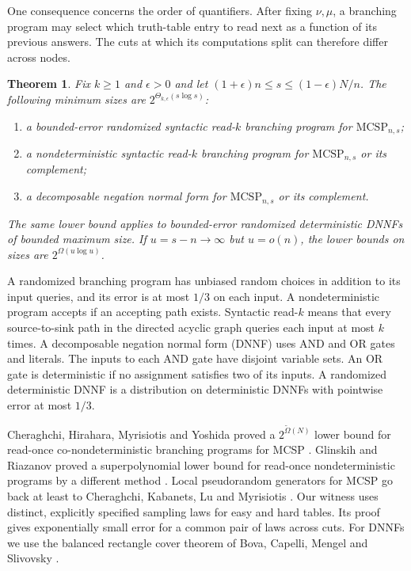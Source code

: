 \documentclass[11pt]{article}
\newtheorem{theorem}{Theorem}[section]
\newcommand{\mc}{\mathrm{MCSP}}
\begin{document}
One consequence concerns the order of quantifiers. After fixing $\nu,\mu$, a branching program may select which truth-table entry to read next as a function of its previous answers. The cuts at which its computations split can therefore differ across nodes.

\begin{theorem}\label{t:size}
Fix $k\ge1$ and $\epsilon>0$ and let $(1+\epsilon)n\le s\le(1-\epsilon)N/n$. The following minimum sizes are $2^{\Theta_{k,\epsilon}(s\log s)}$:
\begin{enumerate}
\item a bounded-error randomized syntactic read-$k$ branching program for $\mc_{n,s}$;
\item a nondeterministic syntactic read-$k$ branching program for $\mc_{n,s}$ or its complement;
\item a decomposable negation normal form for $\mc_{n,s}$ or its complement.
\end{enumerate}
The same lower bound applies to bounded-error randomized deterministic DNNFs of bounded maximum size. If $u=s-n\to\infty$ but $u=o(n)$, the lower bounds on sizes are $2^{\Omega(u\log u)}$.
\end{theorem}

A randomized branching program has unbiased random choices in addition to its input queries, and its error is at most $1/3$ on each input. A nondeterministic program accepts if an accepting path exists. Syntactic read-$k$ means that every source-to-sink path in the directed acyclic graph queries each input at most $k$ times. A decomposable negation normal form (DNNF) uses AND and OR gates and literals. The inputs to each AND gate have disjoint variable sets. An OR gate is deterministic if no assignment satisfies two of its inputs. A randomized deterministic DNNF is a distribution on deterministic DNNFs with pointwise error at most $1/3$.

Cheraghchi, Hirahara, Myrisiotis and Yoshida proved a $2^{\widetilde\Omega(N)}$ lower bound for read-once co-nondeterministic branching programs for MCSP \cite[Corollary~7]{chmy}. Glinskih and Riazanov proved a superpolynomial lower bound for read-once nondeterministic programs by a different method \cite{gr}. Local pseudorandom generators for MCSP go back at least to Cheraghchi, Kabanets, Lu and Myrisiotis \cite{cklm}. Our witness uses distinct, explicitly specified sampling laws for easy and hard tables. Its proof gives exponentially small error for a common pair of laws across cuts. For DNNFs we use the balanced rectangle cover theorem of Bova, Capelli, Mengel and Slivovsky \cite[Theorem~6]{bcms}.
\end{document}
